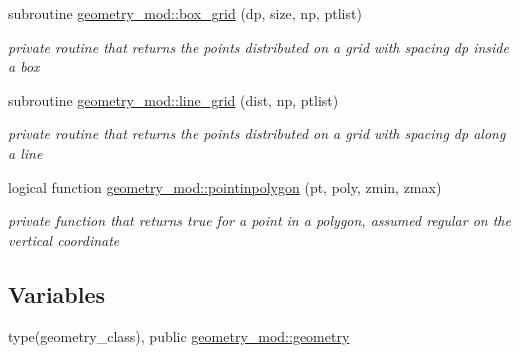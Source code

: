 \begin{DoxyCompactItemize}
subroutine \mbox{\hyperlink{namespacegeometry__mod_ae87e4ecff2d21a839da2b82919b5fd0b}{geometry\+\_\+mod\+::box\+\_\+grid}} (dp, size, np, ptlist)
\begin{DoxyCompactList}\small\item\em private routine that returns the points distributed on a grid with spacing dp inside a box \end{DoxyCompactList}\item 
subroutine \mbox{\hyperlink{namespacegeometry__mod_a48e38bde8ea77f5e1bb42d3fa2c85037}{geometry\+\_\+mod\+::line\+\_\+grid}} (dist, np, ptlist)
\begin{DoxyCompactList}\small\item\em private routine that returns the points distributed on a grid with spacing dp along a line \end{DoxyCompactList}\item 
logical function \mbox{\hyperlink{namespacegeometry__mod_a51bc27aa95191008da7496c7b67b1bf4}{geometry\+\_\+mod\+::pointinpolygon}} (pt, poly, zmin, zmax)
\begin{DoxyCompactList}\small\item\em private function that returns true for a point in a polygon, assumed regular on the vertical coordinate \end{DoxyCompactList}\end{DoxyCompactItemize}
\subsection*{Variables}
\begin{DoxyCompactItemize}
\item 
type(geometry\+\_\+class), public \mbox{\hyperlink{namespacegeometry__mod_ad2ad4f7e1138beaad5f37d5c15b7b457}{geometry\+\_\+mod\+::geometry}}
\end{DoxyCompactItemize}
